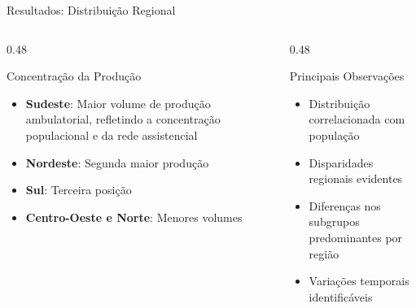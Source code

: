\documentclass[aspectratio=169,10pt]{beamer}
\begin{document}
\begin{frame}{Resultados: Distribuição Regional}

\begin{columns}[T]
\begin{column}{0.48\textwidth}
    \begin{block}{Concentração da Produção}
    \begin{itemize}
        \item \textbf{Sudeste}: Maior volume de produção ambulatorial, refletindo a concentração populacional e da rede assistencial
        \item \textbf{Nordeste}: Segunda maior produção
        \item \textbf{Sul}: Terceira posição
        \item \textbf{Centro-Oeste e Norte}: Menores volumes
    \end{itemize}
    \end{block}
\end{column}
\begin{column}{0.48\textwidth}
    \begin{alertblock}{Principais Observações}
    \begin{itemize}
        \item Distribuição correlacionada com população
        \item Disparidades regionais evidentes
        \item Diferenças nos subgrupos predominantes por região
        \item Variações temporais identificáveis
    \end{itemize}
    \end{alertblock}
\end{column}
\end{columns}

\end{frame}
\end{document}
